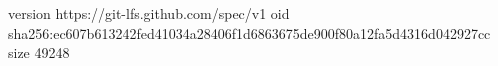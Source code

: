 version https://git-lfs.github.com/spec/v1
oid sha256:ec607b613242fed41034a28406f1d6863675de900f80a12fa5d4316d042927cc
size 49248
